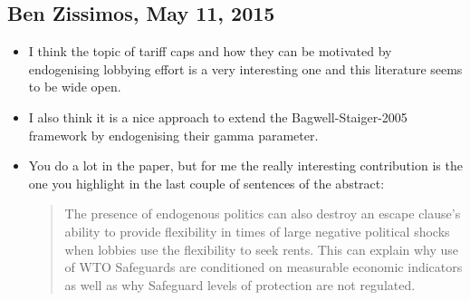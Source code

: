 \documentclass[12pt]{article}
\begin{document}
\newpage
\subsection{Ben Zissimos, May 11, 2015}

\begin{itemize}
	\item I think the topic of tariff caps and how they can be motivated by endogenising lobbying effort is a very interesting one and this literature seems to be wide open.
	\item I also think it is a nice approach to extend the Bagwell-Staiger-2005 framework by endogenising their gamma parameter.
	\item You do a lot in the paper, but for me the really interesting contribution is the one you highlight in the last couple of sentences of the abstract:
\begin{quote}
The presence of endogenous politics can also destroy an escape clause's ability to provide flexibility in times of large negative political shocks when lobbies use the flexibility to seek rents. This can explain why use of WTO Safeguards are conditioned on measurable economic indicators as well as why Safeguard levels of protection are not regulated.
\end{quote}
\end{itemize}
 
\end{document}
